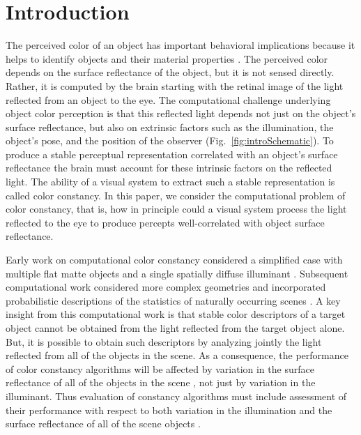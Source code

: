 \documentclass{jov}
\begin{document}
\section{Introduction}
The perceived color of an object has important behavioral implications because it helps to identify objects and their material properties \cite{Mollon89, Jacobs81}.
The perceived color depends on the surface reflectance of the object, but it is not sensed directly. 
Rather, it is computed by the brain starting with the retinal image of the light reflected from an object to the eye.
The computational challenge underlying object color perception is that this reflected light depends not just on the object's surface reflectance, but also on extrinsic factors such as the illumination, the object's pose, and the position of the observer (Fig.~\ref{fig:introSchematic}).
To produce a stable perceptual representation correlated with an object's surface reflectance the brain must account for these intrinsic factors on the reflected light.
The ability of a visual system to extract such a stable representation is called color constancy. 
In this paper, we consider the computational problem of color constancy, that is, how in principle could a visual system process the light reflected to the eye to produce percepts well-correlated with object surface reflectance.

Early work on computational color constancy considered a simplified case with multiple flat matte objects and a single spatially diffuse illuminant \cite{LandRetinex,Buchsbaum80,MaloneyWandell86}. Subsequent computational work considered more complex geometries and incorporated probabilistic descriptions of the statistics of naturally occurring scenes \cite{funt1988color, D'ZmuraConstancy3, barron2012color, D'ZmuraIversonSinger,BrainardFreeman}.
A key insight from this computational work is that stable color descriptors of a target object cannot be obtained from the light reflected from the target object alone.  But, it is possible to obtain such descriptors by analyzing jointly the light reflected from all of the objects in the scene.
As a consequence, the performance of color constancy algorithms will be affected by variation in the surface reflectance of all of the objects in the scene \cite{BrainardWandellRetinex}, not just by variation in the illuminant. Thus evaluation of constancy algorithms must include assessment of their performance with respect to both variation in the illumination and the surface reflectance of all of the scene objects \cite{BrainardWandellRetinex,BrainardFreeman}. 
\end{document}
